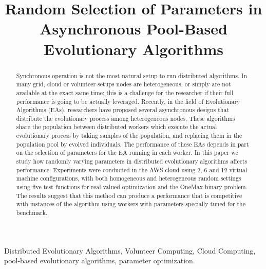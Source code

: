 \documentclass[conference]{IEEEtran}
\begin{document}
\title{Random Selection of Parameters in Asynchronous Pool-Based Evolutionary Algorithms}

\author{
  \and
}

\maketitle
\begin{abstract}
  Synchronous operation is not the most natural setup to run distributed
algorithms. In many grid, cloud or volunteer setups nodes are
heterogeneous, or simply are not available at the exact same time;
this is a challenge for the researcher if their full performance is
going to be actually leveraged. Recently, in the field of Evolutionary
Algorithms (EAs), researchers have proposed several asynchronous 
designs that distribute the evolutionary process among 
heterogeneous nodes. These algorithms share the population between distributed
workers which execute the actual evolutionary process by taking
samples of the population, and replacing them in the population pool
by evolved individuals. The performance of these EAs depends in part
on the selection of parameters for the EA running in each worker. In
this paper we study how randomly  varying parameters in distributed
evolutionary algorithms affects performance. Experiments 
were conducted in the AWS cloud using 2, 6 and 12
virtual machine configurations, with both homogeneous and
heterogeneous random settings using five test functions for
real-valued optimization and the OneMax binary problem. The results suggest that
this method can produce a performance that is competitive with 
instances of the algorithm using workers with parameters 
specially tuned for the benchmark.
\end{abstract}


\begin{IEEEkeywords}
  Distributed Evolutionary Algorithms, Volunteer Computing,
  Cloud Computing, pool-based evolutionary algorithms, parameter optimization. 
\end{IEEEkeywords}
\end{document}

